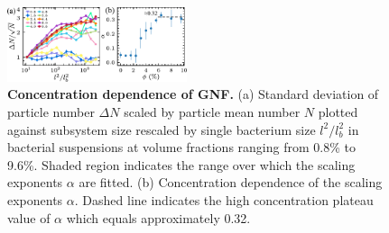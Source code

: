 \documentclass[twocolumn,aps,prl,amsmath,amssymb,longbibliography]{revtex4-2}
\begin{document}
\begin{figure}[ht]
\begin{center}
\includegraphics[width=0.47\textwidth]{figures/GNF/v1.pdf}
\caption[Concentration dependence of GNF.]
{
\textbf{Concentration dependence of GNF.}
(a) Standard deviation of particle number $\Delta N$ scaled by particle mean number $N$ plotted against subsystem size rescaled by single bacterium size $l^2/l_b^2$ in bacterial suspensions at volume fractions ranging from 0.8\% to 9.6\%. Shaded region indicates the range over which the scaling exponents $\alpha$ are fitted.
(b) Concentration dependence of the scaling exponents $\alpha$. Dashed line indicates the high concentration plateau value of $\alpha$ which equals approximately 0.32.
}
\label{fig:GNF}
\end{center}
\end{figure}
\end{document}
